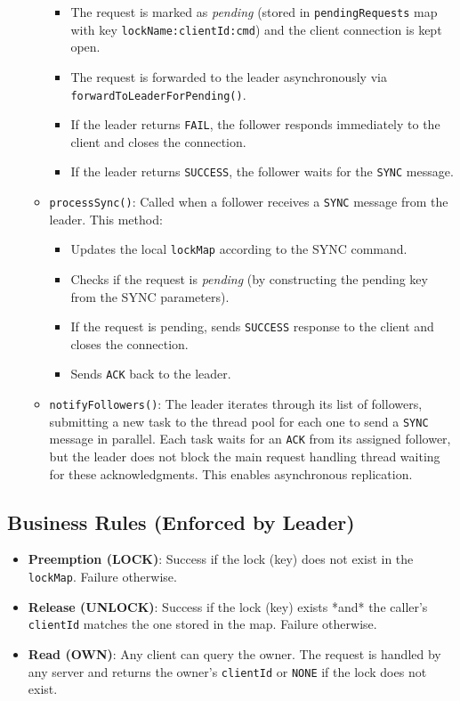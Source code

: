 \documentclass[a4paper,11pt]{article}
\begin{document}
\begin{itemize}
\begin{itemize}
                \begin{itemize}
                    \item The request is marked as \emph{pending} (stored in \texttt{pendingRequests} map with key \texttt{lockName:clientId:cmd}) and the client connection is kept open.
                    \item The request is forwarded to the leader asynchronously via \texttt{forwardToLeaderForPending()}.
                    \item If the leader returns \texttt{FAIL}, the follower responds immediately to the client and closes the connection.
                    \item If the leader returns \texttt{SUCCESS}, the follower waits for the \texttt{SYNC} message.
                \end{itemize}
            \item \texttt{processSync()}: Called when a follower receives a \texttt{SYNC} message from the leader. This method:
                \begin{itemize}
                    \item Updates the local \texttt{lockMap} according to the SYNC command.
                    \item Checks if the request is \emph{pending} (by constructing the pending key from the SYNC parameters).
                    \item If the request is pending, sends \texttt{SUCCESS} response to the client and closes the connection.
                    \item Sends \texttt{ACK} back to the leader.
                \end{itemize}
            \item \texttt{notifyFollowers()}: The leader iterates through its list of followers, submitting a new task to the thread pool for each one to send a \texttt{SYNC} message in parallel. Each task waits for an \texttt{ACK} from its assigned follower, but the leader does not block the main request handling thread waiting for these acknowledgments. This enables asynchronous replication.
        \end{itemize}
\end{itemize}

\subsection*{Business Rules (Enforced by Leader)}
\begin{itemize}
    \item \textbf{Preemption (LOCK)}: Success if the lock (key) does not exist in the \texttt{lockMap}. Failure otherwise.
    \item \textbf{Release (UNLOCK)}: Success if the lock (key) exists *and* the caller's \texttt{clientId} matches the one stored in the map. Failure otherwise.
    \item \textbf{Read (OWN)}: Any client can query the owner. The request is handled by any server and returns the owner's \texttt{clientId} or \texttt{NONE} if the lock does not exist.
\end{itemize}
\end{document}
